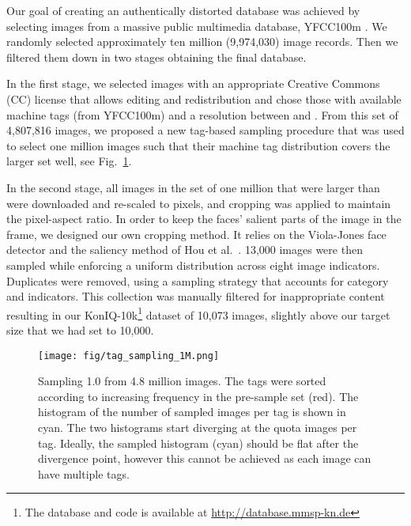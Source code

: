 \documentclass[10pt,journal,compsoc]{IEEEtran}
\begin{document}
Our goal of creating an authentically distorted database was achieved by selecting images from a massive public multimedia database, YFCC\-100m \cite{thomee:2016}. We randomly selected approximately ten million (9,974,030) image records. Then we filtered them down in two stages obtaining the final database.

In the first stage, we selected images with an appropriate Creative Commons (CC) license that allows editing and redistribution and chose those with available machine tags (from YFCC100m) and a resolution between  and . From this set of 4,807,816 images, we proposed a new tag-based sampling procedure that was used to select one million images such that their machine tag distribution covers the larger set well, see Fig.~\ref{fig:tag_sampling}.

In the second stage, all images in the set of one million that were larger than   were downloaded and re-scaled to  pixels, and cropping was applied to maintain the pixel-aspect ratio. In order to keep the faces' salient parts of the image in the frame, we designed our own cropping method. It relies on the Viola-Jones face detector and the saliency method of Hou et al.\ \cite{hou_image_2012}. 13,000 images were then sampled while enforcing a uniform distribution across eight image indicators. Duplicates were removed, using a sampling strategy that accounts for category and indicators. This collection was manually filtered for inappropriate content resulting in our KonIQ-10k\footnote{The database and code is available at \url{http://database.mmsp-kn.de}} dataset of 10,073 images, slightly above our target size that we had set to 10,000.

\begin{figure}[!t]
\centering
\vspace{-10pt}
\texttt{[image: fig/tag\_sampling\_1M.png]}
\caption{Sampling 1.0 from 4.8 million images. The tags were sorted according to increasing frequency in the pre-sample set (red). The histogram of the number of sampled images per tag is shown in cyan. The two histograms start diverging at the quota  images per tag. Ideally, the sampled histogram (cyan) should be flat after the divergence point, however this cannot be achieved as each image can have multiple tags.\vspace{-5pt}}
\label{fig:tag_sampling}
\vspace{-5pt}
\end{figure}
\end{document}
